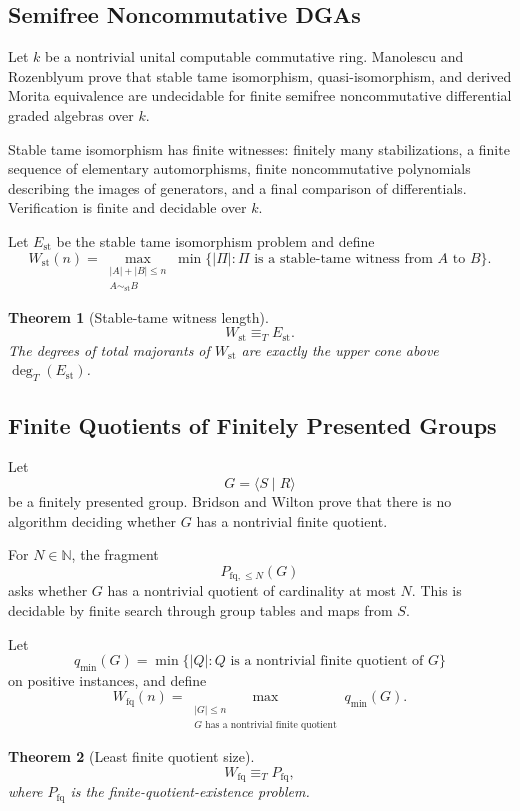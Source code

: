 \documentclass[11pt]{article}
\newtheorem{theorem}{Theorem}[section]
\begin{document}
\subsection{Semifree Noncommutative DGAs}

Let \(k\) be a nontrivial unital computable commutative ring. Manolescu and Rozenblyum prove that stable tame isomorphism, quasi-isomorphism, and derived Morita equivalence are undecidable for finite semifree noncommutative differential graded algebras over \(k\).

Stable tame isomorphism has finite witnesses: finitely many stabilizations, a finite sequence of elementary automorphisms, finite noncommutative polynomials describing the images of generators, and a final comparison of differentials. Verification is finite and decidable over \(k\).

Let \(E_{\mathrm{st}}\) be the stable tame isomorphism problem and define
\[
W_{\mathrm{st}}(n)
=
\max_{\substack{|A|+|B|\le n\\ A\sim_{\mathrm{st}} B}}
\min\{|\Pi|:\Pi\text{ is a stable-tame witness from }A\text{ to }B\}.
\]

\begin{theorem}[Stable-tame witness length]
\[
W_{\mathrm{st}}\equiv_T E_{\mathrm{st}}.
\]
The degrees of total majorants of \(W_{\mathrm{st}}\) are exactly the upper cone above \(\deg_T(E_{\mathrm{st}})\).
\end{theorem}

\subsection{Finite Quotients of Finitely Presented Groups}

Let
\[
G=\langle S\mid R\rangle
\]
be a finitely presented group. Bridson and Wilton prove that there is no algorithm deciding whether \(G\) has a nontrivial finite quotient.

For \(N\in\mathbb N\), the fragment
\[
P_{\mathrm{fq},\le N}(G)
\]
asks whether \(G\) has a nontrivial quotient of cardinality at most \(N\). This is decidable by finite search through group tables and maps from \(S\).

Let
\[
q_{\min}(G)=
\min\{|Q|:Q\text{ is a nontrivial finite quotient of }G\}
\]
on positive instances, and define
\[
W_{\mathrm{fq}}(n)
=
\max_{\substack{|G|\le n\\G\text{ has a nontrivial finite quotient}}}
q_{\min}(G).
\]

\begin{theorem}[Least finite quotient size]
\[
W_{\mathrm{fq}}\equiv_T P_{\mathrm{fq}},
\]
where \(P_{\mathrm{fq}}\) is the finite-quotient-existence problem.
\end{theorem}
\end{document}
